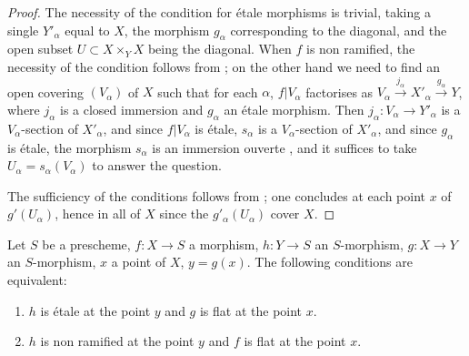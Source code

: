\begin{proof}
The necessity of the condition for \'etale morphisms is trivial, taking a single $Y'_\alpha$ equal to $X$, the morphism $g_\alpha$ corresponding to the diagonal, and the open subset $U\subset X\times_Y X$ being the diagonal.
When $f$ is non ramified, the necessity of the condition follows from ;
on the other hand we need to find an open covering $(V_\alpha)$ of $X$ such that for each $\alpha$, $f|V_\alpha$ factorises as $V_\alpha\xrightarrow{j_\alpha}X'_\alpha\xrightarrow{g_\alpha}Y$, where $j_\alpha$ is a closed immersion and $g_\alpha$ an \'etale morphism.
Then $j_\alpha:V_\alpha\to Y'_\alpha$ is a $V_\alpha$-section of $X'_\alpha$, and since $f|V_\alpha$ is \'etale, $s_\alpha$ is a $V_\alpha$-section of $X'_\alpha$, and since $g_\alpha$ is \'etale, the morphism $s_\alpha$ is an immersion ouverte , and it suffices to take $U_\alpha=s_\alpha(V_\alpha)$ to answer the question.

The sufficiency of the conditions follows from ;
one concludes at each point $x$ of $g'(U_\alpha)$, hence in all of $X$ since the $g'_\alpha(U_\alpha)$ cover $X$.
\end{proof}

\begin{proposition}[18.4.9]
\label{IV.18.4.9}
Let $S$ be a prescheme, $f:X\to S$ a morphism, $h:Y\to S$ an $S$-morphism, $g:X\to Y$ an $S$-morphism, $x$ a point of $X$, $y=g(x)$.
The following conditions are equivalent:
\begin{enumerate}[label=\emph{\alph*)}]
  \item $h$ is \'etale at the point $y$ and $g$ is flat at the point $x$.
  \item $h$ is non ramified at the point $y$ and $f$ is flat at the point $x$.
\end{enumerate}
\end{proposition}

